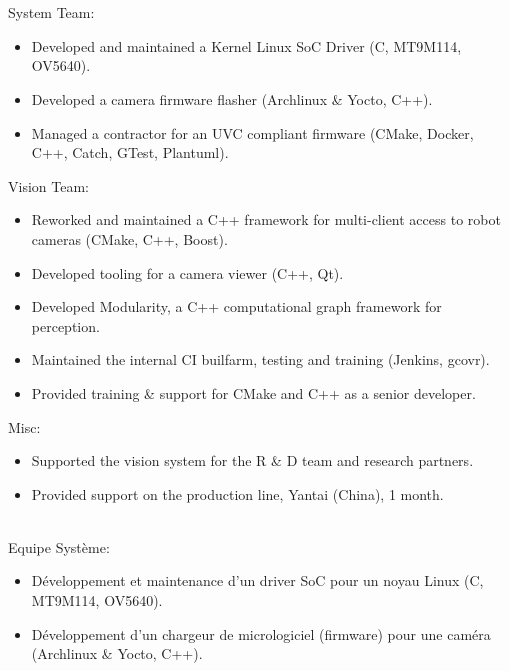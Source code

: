 \documentclass{resume}
\begin{document}
\bigskip

 \\
 {
   \\
  System Team:\\
  \begin{itemize}
  	\item Developed and maintained a Kernel Linux SoC Driver (C, MT9M114, OV5640).
  	\item Developed a camera firmware flasher (Archlinux \& Yocto, C++).
  	\item Managed a contractor for an UVC compliant firmware (CMake, Docker, C++, Catch, GTest, Plantuml).
  \end{itemize}
  Vision Team:\\
  \begin{itemize}
  	\item Reworked and maintained a C++ framework for multi-client access to robot cameras (CMake, C++, Boost).
  	\item Developed tooling for a camera viewer (C++, Qt).
  	\item Developed Modularity, a C++ computational graph framework for perception.
  	\item Maintained the internal CI builfarm, testing and training (Jenkins,
  		gcovr).
  	\item Provided training \& support for CMake and C++ as a senior developer.
  \end{itemize}
  Misc:\\
  \begin{itemize}
  	\item Supported the vision system for the R \& D team and research partners.
  	\item Provided support on the production line, Yantai (China), 1 month.
  \end{itemize}
} {
   \\
  Equipe Syst\`{e}me:\\
  \begin{itemize}
  	\item D\'{e}veloppement et maintenance d'un driver SoC pour un noyau Linux (C, MT9M114, OV5640).
  	\item D\'{e}veloppement d'un chargeur de micrologiciel (firmware) pour une cam\'{e}ra (Archlinux \& Yocto, C++).

\end{itemize}}
\end{document}

